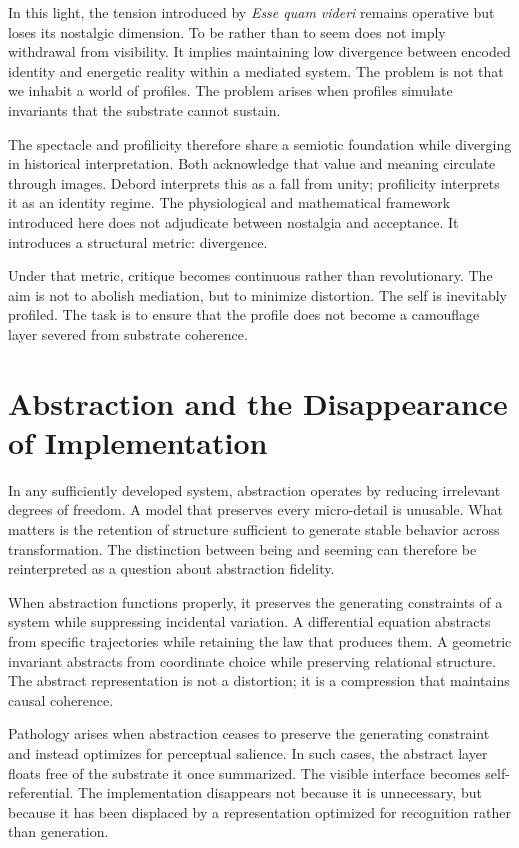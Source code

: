 \documentclass[11pt]{article}
\begin{document}
In this light, the tension introduced by \textit{Esse quam videri} remains operative but loses its nostalgic dimension. To be rather than to seem does not imply withdrawal from visibility. It implies maintaining low divergence between encoded identity and energetic reality within a mediated system. The problem is not that we inhabit a world of profiles. The problem arises when profiles simulate invariants that the substrate cannot sustain.

The spectacle and profilicity therefore share a semiotic foundation while diverging in historical interpretation. Both acknowledge that value and meaning circulate through images. Debord interprets this as a fall from unity; profilicity interprets it as an identity regime. The physiological and mathematical framework introduced here does not adjudicate between nostalgia and acceptance. It introduces a structural metric: divergence.

Under that metric, critique becomes continuous rather than revolutionary. The aim is not to abolish mediation, but to minimize distortion. The self is inevitably profiled. The task is to ensure that the profile does not become a camouflage layer severed from substrate coherence.


\section{Abstraction and the Disappearance of Implementation}

In any sufficiently developed system, abstraction operates by reducing irrelevant degrees of freedom. A model that preserves every micro-detail is unusable. What matters is the retention of structure sufficient to generate stable behavior across transformation. The distinction between being and seeming can therefore be reinterpreted as a question about abstraction fidelity.

When abstraction functions properly, it preserves the generating constraints of a system while suppressing incidental variation. A differential equation abstracts from specific trajectories while retaining the law that produces them. A geometric invariant abstracts from coordinate choice while preserving relational structure. The abstract representation is not a distortion; it is a compression that maintains causal coherence.

Pathology arises when abstraction ceases to preserve the generating constraint and instead optimizes for perceptual salience. In such cases, the abstract layer floats free of the substrate it once summarized. The visible interface becomes self-referential. The implementation disappears not because it is unnecessary, but because it has been displaced by a representation optimized for recognition rather than generation.
\end{document}

